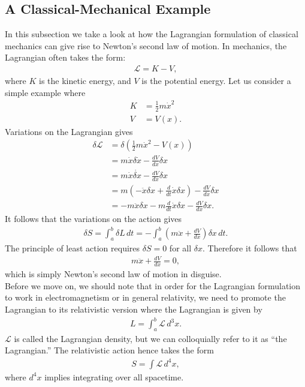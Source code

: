 \documentclass[a4paper,11pt]{article}
\numberwithin{equation}{section}
\theoremstyle{definition}
\begin{document}
\subsection{A Classical-Mechanical Example}
In this subsection we take a look at how the Lagrangian formulation of classical mechanics can give rise to Newton's second law of motion. In mechanics, the Lagrangian often takes the form:
\begin{align}
\mathcal{L} = K - V,
\end{align}
where $K$ is the kinetic energy, and $V$ is the potential energy. Let us consider a simple example where
\begin{align}
K &= \frac{1}{2}m\dot{x}^2\\
V &= V(x).
\end{align}
Variations on the Lagrangian gives
\begin{align}
\delta \mathcal{L} &= \delta\left( \frac{1}{2}m\dot{x}^2 - V(x) \right)\\
&= m\dot{x}\delta \dot{x} - \frac{dV}{dx}\delta x\\
&= m\dot{x}\dot{\delta x} - \frac{dV}{dx}\delta x\\
&= m \left( -\ddot{x}\delta x + \frac{d}{dt}\dot{x}\delta x \right) - \frac{dV}{dx}\delta x\\
&= -m\ddot{x}\delta x - m\frac{d}{dt}\dot{x}\delta x - \frac{dV}{dx}\delta x. 
\end{align}
It follows that the variations on the action gives
\begin{align}
\delta S = \int_{a}^{b}\delta L \,dt = -\int_a^b\left( m\ddot{x} + \frac{dV}{dx} \right)\delta x\,dt.
\end{align}
The principle of least action requires $\delta S = 0$ for all $\delta x$. Therefore it follows that
\begin{align}
m\ddot{x} + \frac{dV}{dx} = 0,
\end{align}
which is simply Newton's second law of motion in disguise. \\

Before we move on, we should note that in order for the Lagrangian formulation to work in electromagnetism or in general relativity, we need to promote the Lagrangian to its relativistic version where the Lagrangian is given by
\begin{align}
L = \int_a^b\mathcal{L}\,d^3x.
\end{align}
$\mathcal{L}$ is called the Lagrangian density, but we can colloquially refer to it as ``the Lagrangian.'' The relativistic action hence takes the form
\begin{align}
S = \int \mathcal{L}\,d^4x,
\end{align}
where $d^4x$ implies integrating over all spacetime.
\end{document}
